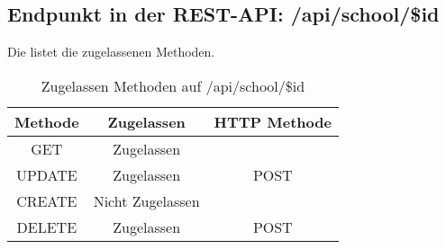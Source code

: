 \subsection{Endpunkt in der REST-API: /api/school/\$id}
Die  listet die zugelassenen Methoden. 

\begin{table}[!htbp]
	\begin{tabular}{|c|c|c|}
		\hline
			\textbf{Methode} & \textbf{Zugelassen} & \textbf{HTTP Methode} \\ \hline
			GET & Zugelassen &  \\ \hline
			UPDATE & Zugelassen & POST \\ \hline 
			CREATE & Nicht Zugelassen & \\ \hline 
			DELETE & Zugelassen & POST \\ \hline
	\end{tabular}

		\caption{Zugelassen Methoden auf /api/school/\$id}
		\label{tab:end:rest:api:school:id:meth}
\end{table}